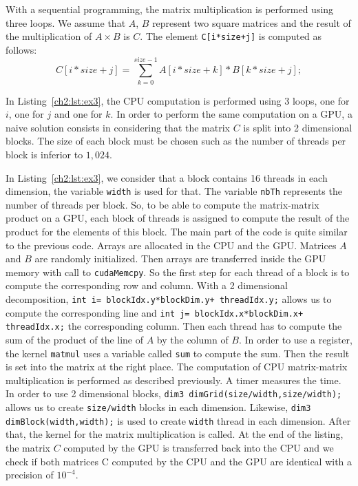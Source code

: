With  a sequential  programming, the  matrix multiplication  is  performed using
three loops. We assume that $A$, $B$  represent two square matrices and the
result   of    the   multiplication    of   $A   \times    B$   is    $C$.   The
element \texttt{C[i*size+j]} is computed as follows:
\begin{equation}
C[i*size+j]=\sum_{k=0}^{size-1} A[i*size+k]*B[k*size+j];
\end{equation}

In Listing~\ref{ch2:lst:ex3},  the CPU computation  is performed using  3 loops,
one  for $i$,  one for  $j$  and one  for $k$.   In  order to  perform the  same
computation on a  GPU, a naive solution consists in  considering that the matrix
$C$ is split into  2 dimensional blocks.  The size of each  block must be chosen
such as the number of threads per block is inferior to $1,024$.


In Listing~\ref{ch2:lst:ex3},  we consider that  a block contains 16  threads in
each   dimension,  the   variable  \texttt{width}   is  used   for   that.   The
variable \texttt{nbTh} represents the number of threads per block. So, to be able
to compute the matrix-matrix product on a GPU, each block of threads is assigned
to compute the result  of the product for the elements of  this block.  The main
part of the code is quite similar to the previous code.  Arrays are allocated in
the  CPU and  the GPU.   Matrices $A$  and $B$  are randomly  initialized.  Then
arrays are  transferred inside the  GPU memory with call  to \texttt{cudaMemcpy}.
So the first step for each thread of a block is to compute the corresponding row
and   column.    With   a    2   dimensional   decomposition,   \texttt{int   i=
blockIdx.y*blockDim.y+ threadIdx.y;} allows us to compute the corresponding line
and  \texttt{int  j=   blockIdx.x*blockDim.x+  threadIdx.x;}  the  corresponding
column. Then each  thread has to compute the  sum of the product of  the line of
$A$   by   the  column   of   $B$.    In  order   to   use   a  register,   the
kernel  \texttt{matmul}  uses a  variable  called  \texttt{sum}  to compute  the
sum. Then the result is set into  the matrix at the right place. The computation
of  CPU matrix-matrix multiplication  is performed  as described  previously.  A
timer measures  the time.   In order to  use 2 dimensional  blocks, \texttt{dim3
dimGrid(size/width,size/width);} allows us  to create \texttt{size/width} blocks
in each  dimension.  Likewise,  \texttt{dim3 dimBlock(width,width);} is  used to
create \texttt{width} thread  in each dimension. After that,  the kernel for the
matrix  multiplication is  called. At  the end  of the  listing, the  matrix $C$
computed by the GPU is transferred back  into the CPU and we check if both matrices
C computed by the CPU and the GPU are identical with a precision of $10^{-4}$.


